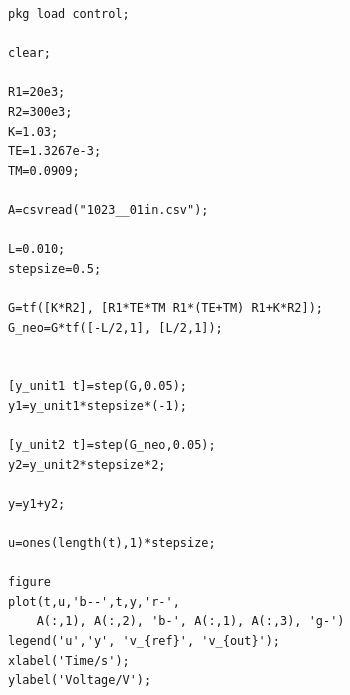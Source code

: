 \documentclass[uplatex, 11pt,a4j, titlepage]{jsarticle}
\begin{document}
\newpage

\begin{lstlisting}[caption={vain\_2.m}]
pkg load control;

clear;

R1=20e3;
R2=300e3;
K=1.03;
TE=1.3267e-3;
TM=0.0909;

A=csvread("1023__01in.csv");

L=0.010;
stepsize=0.5;

G=tf([K*R2], [R1*TE*TM R1*(TE+TM) R1+K*R2]);
G_neo=G*tf([-L/2,1], [L/2,1]);


[y_unit1 t]=step(G,0.05);
y1=y_unit1*stepsize*(-1);

[y_unit2 t]=step(G_neo,0.05);
y2=y_unit2*stepsize*2;

y=y1+y2;

u=ones(length(t),1)*stepsize;

figure
plot(t,u,'b--',t,y,'r-', 
    A(:,1), A(:,2), 'b-', A(:,1), A(:,3), 'g-')
legend('u','y', 'v_{ref}', 'v_{out}');
xlabel('Time/s');
ylabel('Voltage/V');
\end{lstlisting}


\newpage
\thispagestyle{empty}
\nocite{key1}
\nocite{key2}


\end{document}
